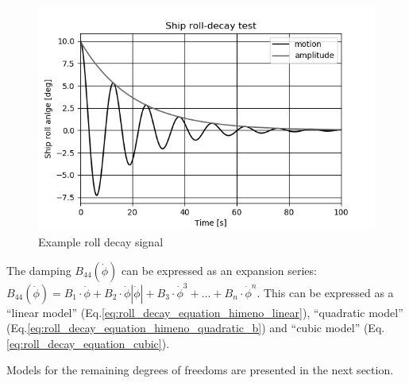\begin{figure}[H]
    \centering
    \includegraphics[width=\linewidth]{kappa/images/roll-decay.png}
    \caption{Example roll decay signal}
    \label{fig:rolldecay}
\end{figure}

\noindent The damping $B_{44}\left(\dot{\phi}\right)$ can be expressed as an expansion series:  
$ B_{44}\left(\dot{\phi}\right) = B_1\cdot\dot{\phi} + B_2\cdot\dot{\phi}\left|\dot{\phi}\right| + B_3\cdot\dot{\phi}^3 + ... + B_n\cdot\dot{\phi}^n$. This can be expressed as a ``linear model'' (Eq.\ref{eq:roll_decay_equation_himeno_linear}), ``quadratic model'' (Eq.\ref{eq:roll_decay_equation_himeno_quadratic_b}) and ``cubic model'' (Eq.\ref{eq:roll_decay_equation_cubic}).




Models for the remaining degrees of freedoms are presented in the next section.


